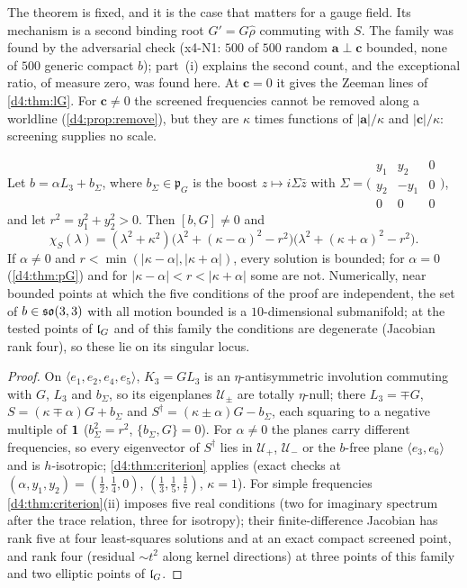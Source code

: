 The theorem is fixed, and it is the case that matters for a gauge field. Its mechanism is a second binding root $G'=G\hat\rho$ commuting with
$S$. The family was found by the adversarial check (x4-N1: $500$ of $500$ random $\mathbf a\perp\mathbf c$ bounded, none of $500$ generic compact $b$);
part~(i) explains the second count, and the exceptional ratio, of measure zero, was found here. At $\mathbf c=0$ it gives the Zeeman lines of
\cref{d4:thm:lG}. For $\mathbf c\neq0$ the screened frequencies cannot be removed along a worldline (\cref{d4:prop:remove}), but they are $\kappa$ times
functions of $|\mathbf a|/\kappa$ and $|\mathbf c|/\kappa$: screening supplies no scale.

\begin{proposition}
\label{d4:prop:gyro}
Let $b=\alpha L_3+b_\Sigma$, where $b_\Sigma\in\mathfrak p_G$ is the boost $z\mapsto i\Sigma\bar z$ with $\Sigma=\bigl(\begin{smallmatrix}y_1&y_2&0\\y_2&-y_1&0\\0&0&0\end{smallmatrix}\bigr)$,
and let $r^2=y_1^2+y_2^2>0$. Then $[b,G]\neq0$ and
\[
\chi_S(\lambda)=(\lambda^2+\kappa^2)\bigl(\lambda^2+(\kappa-\alpha)^2-r^2\bigr)\bigl(\lambda^2+(\kappa+\alpha)^2-r^2\bigr).
\]
If $\alpha\neq0$ and $r<\min(|\kappa-\alpha|,|\kappa+\alpha|)$, every solution is bounded; for $\alpha=0$ (\cref{d4:thm:pG}) and for
$|\kappa-\alpha|<r<|\kappa+\alpha|$ some are not. Numerically, near bounded points at which the five conditions of the proof are independent,
the set of $b\in\mathfrak{so}(3,3)$ with all motion bounded is a $10$-dimensional submanifold; at the tested points of $\mathfrak l_G$ and of this family the
conditions are degenerate (Jacobian rank four), so these lie on its singular locus.
\end{proposition}

\begin{proof}
On $\langle e_1,e_2,e_4,e_5\rangle$, $K_3=GL_3$ is an $\eta$-antisymmetric involution commuting with $G$, $L_3$ and $b_\Sigma$, so its eigenplanes
$\mathcal U_\pm$ are totally $\eta$-null; there $L_3=\mp G$, $S=(\kappa\mp\alpha)G+b_\Sigma$ and $S^\dagger=(\kappa\pm\alpha)G-b_\Sigma$, each squaring to a negative
multiple of $\mathbf 1$ ($b_\Sigma^2=r^2$, $\{b_\Sigma,G\}=0$). For $\alpha\neq0$ the planes carry different frequencies, so every eigenvector of $S^\dagger$ lies in
$\mathcal U_+$, $\mathcal U_-$ or the $b$-free plane $\langle e_3,e_6\rangle$ and is $h$-isotropic; \cref{d4:thm:criterion} applies (exact checks at
$(\alpha,y_1,y_2)=(\tfrac12,\tfrac14,0)$, $(\tfrac13,\tfrac15,\tfrac17)$, $\kappa=1$). For simple frequencies \cref{d4:thm:criterion}(ii) imposes five real
conditions (two for imaginary spectrum after the trace relation, three for isotropy); their finite-difference Jacobian has rank five at four
least-squares solutions and at an exact compact screened point, and rank four (residual $\sim t^2$ along kernel directions) at three points of
this family and two elliptic points of $\mathfrak l_G$.
\end{proof}

